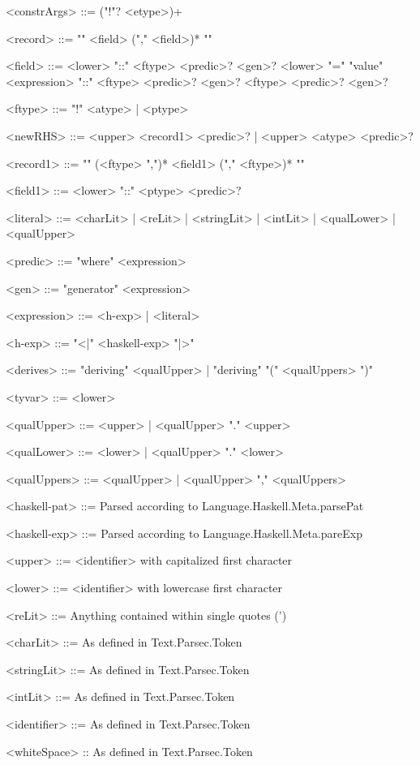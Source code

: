 \documentclass{article}
\begin{document}
\begin{grammar}
<constrArgs> ::= ("!"? <etype>)+

<record>     ::= "{" <field> ("," <field>)* "}"

<field>       ::= <lower> "::" <ftype> <predic>? <gen>?
             \alt  <lower> "=" "value" <expression> "::" <ftype> <predic>? <gen>?
             \alt  <ftype> <predic>? <gen>?

<ftype>      ::= "!" <atype> | <ptype>

<newRHS>     ::= <upper> <record1> <predic>? | <upper> <atype> <predic>?

<record1>    ::= "{" (<ftype> ",")* <field1> ("," <ftype>)* "}"

<field1>      ::= <lower> "::" <ptype> <predic>?

<literal>    ::= <charLit> | <reLit> | <stringLit> | <intLit> | <qualLower> | <qualUpper>

<predic> ::= "where" <expression>

<gen>        ::= "generator" <expression>

<expression> ::= <h-exp> | <literal>

<h-exp>      ::= "<|" <haskell-exp> "|>"

<derives> ::= "deriving" <qualUpper> | "deriving" "(" <qualUppers> ")"

<tyvar> ::= <lower>

<qualUpper> ::= <upper> | <qualUpper> "." <upper>

<qualLower> ::= <lower> | <qualUpper> "." <lower>

<qualUppers> ::= <qualUpper> | <qualUpper> "," <qualUppers>

<haskell-pat> ::= Parsed according to Language.Haskell.Meta.parsePat

<haskell-exp> ::= Parsed according to Language.Haskell.Meta.pareExp

<upper> ::= <identifier> with capitalized first character

<lower> ::= <identifier> with lowercase first character

<reLit> ::= Anything contained within single quotes (')

<charLit> ::=  As defined in Text.Parsec.Token

<stringLit>  ::= As defined in Text.Parsec.Token

<intLit> ::= As defined in Text.Parsec.Token

<identifier> ::= As defined in Text.Parsec.Token

<whiteSpace> :: As defined in Text.Parsec.Token
\end{grammar}
\end{document}
